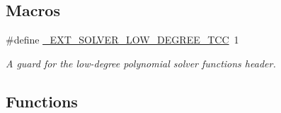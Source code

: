 \subsection*{Macros}
\begin{DoxyCompactItemize}
\item 
\#define \hyperlink{solver__low__degree_8tcc_a10202d26918e17d656cf14da05e26477}{\+\_\+\+E\+X\+T\+\_\+\+S\+O\+L\+V\+E\+R\+\_\+\+L\+O\+W\+\_\+\+D\+E\+G\+R\+E\+E\+\_\+\+T\+CC}~1
\begin{DoxyCompactList}\small\item\em A guard for the low-\/degree polynomial solver functions header. \end{DoxyCompactList}\end{DoxyCompactItemize}
\subsection*{Functions}
